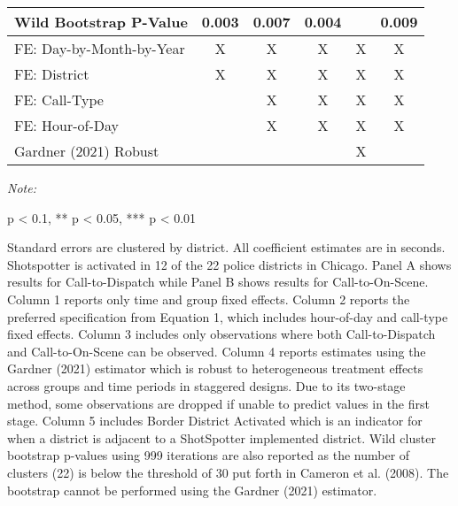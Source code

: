 \begin{table}[H]
\begin{threeparttable}
\begin{tabular}[t]{lccccc}
\hspace{1em}Wild Bootstrap P-Value & 0.003 & 0.007 & 0.004 &  & 0.009\\
\midrule
FE: Day-by-Month-by-Year & X & X & X & X & X\\
FE: District & X & X & X & X & X\\
FE: Call-Type &  & X & X & X & X\\
FE: Hour-of-Day &  & X & X & X & X\\
Gardner (2021) Robust &  &  &  & X & \\
\bottomrule
\end{tabular}
\begin{tablenotes}
\item \textit{Note: } 
\item * p < 0.1, ** p < 0.05, *** p < 0.01
\item Standard errors are clustered by district. All                      coefficient estimates are in seconds.                  Shotspotter is activated in 12 of the 22 police districts in Chicago.                  Panel A shows results for Call-to-Dispatch while                  Panel B shows results for Call-to-On-Scene. Column 1 reports                  only time and group fixed effects. Column 2 reports the preferred                  specification from Equation 1, which includes hour-of-day and                  call-type fixed effects. Column 3 includes only observations where both                  Call-to-Dispatch and Call-to-On-Scene can be observed.                  Column 4 reports estimates using                  the Gardner (2021) estimator which is robust to                   heterogeneous treatment effects across groups and time periods                  in staggered designs. Due to its two-stage method, some observations are dropped if                  unable to predict values in the first stage. Column 5 includes Border District Activated                  which is an indicator for when a district is adjacent to a ShotSpotter                  implemented district. Wild cluster bootstrap p-values using 999 iterations are also reported                  as the number of clusters (22) is below the threshold of 30 put forth in                  Cameron et al. (2008). The bootstrap cannot be performed using the Gardner (2021) estimator.                                    
\end{tablenotes}
\end{threeparttable}
\end{table}
